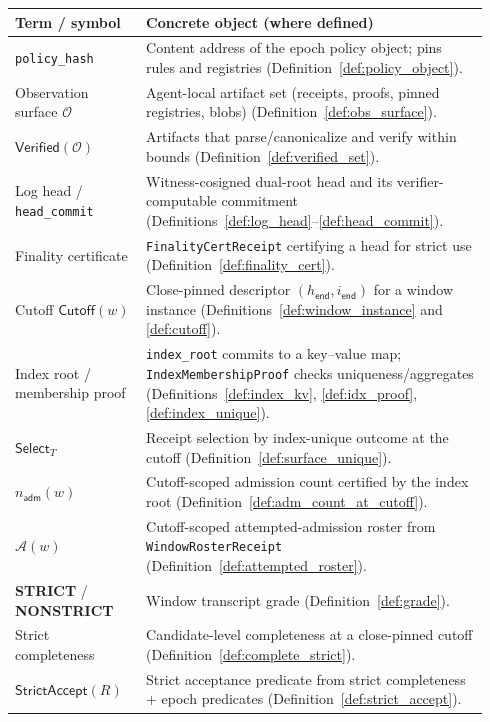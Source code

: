 \documentclass[11pt]{article}
\newcommand{\code}[1]{\texttt{#1}}
\newcommand{\1}{\mathbf{1}}
\theoremstyle{definition}
\theoremstyle{plain}
\begin{document}
\begin{table}[H]
\centering
\small
\begin{tabular}{p{0.26\linewidth} p{0.68\linewidth}}
\toprule
\textbf{Term / symbol} & \textbf{Concrete object (where defined)} \\ \midrule
\code{policy\_hash} & Content address of the epoch policy object; pins rules and registries (Definition~\ref{def:policy_object}). \\
Observation surface $\mathcal{O}$ & Agent-local artifact set (receipts, proofs, pinned registries, blobs) (Definition~\ref{def:obs_surface}). \\
$\mathsf{Verified}(\mathcal{O})$ & Artifacts that parse/canonicalize and verify within bounds (Definition~\ref{def:verified_set}). \\
Log head / \code{head\_commit} & Witness-cosigned dual-root head and its verifier-computable commitment (Definitions~\ref{def:log_head}--\ref{def:head_commit}). \\
Finality certificate & \code{FinalityCertReceipt} certifying a head for strict use (Definition~\ref{def:finality_cert}). \\
Cutoff $\textsf{Cutoff}(w)$ & Close-pinned descriptor $(h_{\textsf{end}},i_{\textsf{end}})$ for a window instance (Definitions~\ref{def:window_instance} and \ref{def:cutoff}). \\
Index root / membership proof & \code{index\_root} commits to a key--value map; \code{IndexMembershipProof} checks uniqueness/aggregates (Definitions~\ref{def:index_kv}, \ref{def:idx_proof}, \ref{def:index_unique}). \\
$\mathsf{Select}_T$ & Receipt selection by index-unique outcome at the cutoff (Definition~\ref{def:surface_unique}). \\
$n_{\textsf{adm}}(w)$ & Cutoff-scoped admission count certified by the index root (Definition~\ref{def:adm_count_at_cutoff}). \\
$\mathcal{A}(w)$ & Cutoff-scoped attempted-admission roster from \code{WindowRosterReceipt} (Definition~\ref{def:attempted_roster}). \\
\textbf{STRICT} / \textbf{NONSTRICT} & Window transcript grade (Definition~\ref{def:grade}). \\
Strict completeness & Candidate-level completeness at a close-pinned cutoff (Definition~\ref{def:complete_strict}). \\
$\mathsf{StrictAccept}(R)$ & Strict acceptance predicate from strict completeness + epoch predicates (Definition~\ref{def:strict_accept}). \\

\end{tabular}
\end{table}
\end{document}
